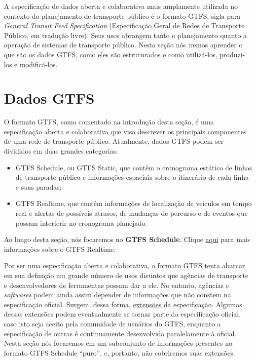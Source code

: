 \documentclass[
  letterpaper,
  DIV=11,
  numbers=noendperiod]{scrreprt}
\providecommand{\tightlist}{%
  \setlength{\itemsep}{0pt}\setlength{\parskip}{0pt}}\usepackage{longtable,booktabs,array}
\begin{document}
A especificação de dados aberta e colaborativa mais amplamente utilizada
no contexto do planejamento de transporte público é o formato GTFS,
sigla para \emph{General Transit Feed Specification} (Especificação
Geral de Redes de Transporte Público, em tradução livre). Seus usos
abrangem tanto o planejamento quanto a operação de sistemas de
transporte público. Nesta seção nós iremos aprender o que são os dados
GTFS, como eles são estruturados e como utilizá-los, produzi-los e
modificá-los.

\hypertarget{dados-gtfs}{%
\chapter{Dados GTFS}\label{dados-gtfs}}

O formato GTFS, como comentado na introdução desta seção, é uma
especificação aberta e colaborativa que visa descrever os principais
componentes de uma rede de transporte público. Atualmente, dados GTFS
podem ser divididos em duas grandes categorias:

\begin{itemize}
\tightlist
\item
  GTFS Schedule, ou GTFS Static, que contém o cronograma estático de
  linhas de transporte público e informações espaciais sobre o
  itinerário de cada linha e suas paradas;
\item
  GTFS Realtime, que contém informações de localização de veículos em
  tempo real e alertas de possíveis atrasos, de mudanças de percurso e
  de eventos que possam interferir no cronograma planejado.
\end{itemize}

Ao longo desta seção, nós focaremos no \textbf{GTFS Schedule}. Clique
\href{https://gtfs.org/realtime/}{aqui} para mais informações sobre o
GTFS Realtime.

Por ser uma especificação aberta e colaborativa, o formato GTFS tenta
abarcar em sua definição um grande número de usos distintos que agências
de transporte e desenvolvedores de ferramentas possam dar a ele. No
entanto, agências e \emph{softwares} podem ainda assim depender de
informações que não constem na especificação oficial. Surgem, dessa
forma, \href{https://gtfs.org/extensions/}{extensões} da especificação.
Algumas dessas extensões podem eventualmente se tornar parte da
especificação oficial, caso isto seja aceito pela comunidade de usuários
do GTFS, enquanto a especificação de outras é continuamente desenvolvida
paralelamente à oficial. Nesta seção nós focaremos em um subconjunto de
informações presentes no formato GTFS Schedule ``puro'', e, portanto,
não cobriremos suas extensões.
\end{document}
